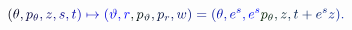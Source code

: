 \documentclass[12pt]{article}
\begin{document}
\makeatletter
\renewcommand*{\@textcolor}[3]{%
  \protect\leavevmode
  \begingroup
    \color#1{#2}#3%
  \endgroup
}
\makeatother
\begin{displaymath}
\mathcolor[RGB]{0,0,15}{(} \mathcolor[RGB]{0,0,30}{\theta} \mathcolor[RGB]{0,0,45}{,} \mathcolor[RGB]{0,0,60}{p} _ { \mathcolor[RGB]{0,0,75}{\theta} } \mathcolor[RGB]{0,0,90}{,} \mathcolor[RGB]{0,0,105}{z} \mathcolor[RGB]{0,0,120}{,} \mathcolor[RGB]{0,0,135}{s} \mathcolor[RGB]{0,0,150}{,} \mathcolor[RGB]{0,0,165}{t} \mathcolor[RGB]{0,0,180}{)} \mathcolor[RGB]{0,0,195}{\mapsto} \mathcolor[RGB]{0,0,210}{(} \mathcolor[RGB]{0,0,225}{\vartheta} \mathcolor[RGB]{0,0,240}{,} \mathcolor[RGB]{0,0,255}{r} \mathcolor[RGB]{0,15,0}{,} \mathcolor[RGB]{0,15,15}{p} _ { \mathcolor[RGB]{0,15,30}{\vartheta} } \mathcolor[RGB]{0,15,45}{,} \mathcolor[RGB]{0,15,60}{p} _ { \mathcolor[RGB]{0,15,75}{r} } \mathcolor[RGB]{0,15,90}{,} \mathcolor[RGB]{0,15,105}{w} \mathcolor[RGB]{0,15,120}{)} \mathcolor[RGB]{0,15,135}{=} \mathcolor[RGB]{0,15,150}{(} \mathcolor[RGB]{0,15,165}{\theta} \mathcolor[RGB]{0,15,180}{,} \mathcolor[RGB]{0,15,195}{e} ^ { \mathcolor[RGB]{0,15,210}{s} } \mathcolor[RGB]{0,15,225}{,} \mathcolor[RGB]{0,15,240}{e} ^ { \mathcolor[RGB]{0,15,255}{s} } \mathcolor[RGB]{0,30,0}{p} _ { \mathcolor[RGB]{0,30,15}{\theta} } \mathcolor[RGB]{0,30,30}{,} \mathcolor[RGB]{0,30,45}{z} \mathcolor[RGB]{0,30,60}{,} \mathcolor[RGB]{0,30,75}{t} \mathcolor[RGB]{0,30,90}{+} \mathcolor[RGB]{0,30,105}{e} ^ { \mathcolor[RGB]{0,30,120}{s} } \mathcolor[RGB]{0,30,135}{z} \mathcolor[RGB]{0,30,150}{)} \mathcolor[RGB]{0,30,165}{.}
\end{displaymath}
\end{document}
